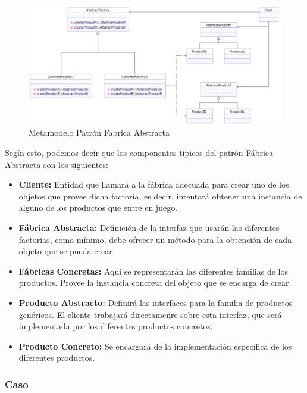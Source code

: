 \begin{figure}[th!]
	\centering
	\includegraphics[width=1.0\linewidth]{arquitectura/imagenes/modeloFabAbs}
	\caption{Metamodelo Patrón Fabrica Abstracta}
	\label{fig:metamodelo fabrica abstracta}
\end{figure}

Segín esto, podemos decir que los componentes típicos del patrón Fábrica Abstracta son los siguientes:

\begin{itemize}
	\item \textbf{Cliente: }Entidad que llamará a la fábrica adecuada para crear uno de los objetos que provee dicha factoría, es decir, intentará obtener una instancia de alguno de los productos que entre en juego.
	\item \textbf{Fábrica Abstracta: }Definición de la interfaz que usarán las diferentes factorías, como mínimo, debe ofrecer un método para la obtención de cada objeto que se pueda crear
	\item \textbf{Fábricas Concretas: } Aquí se representarán las diferentes familias de los productos. Provee la instancia concreta del objeto que se encarga de crear.
	\item \textbf{Producto Abstracto: }Definirá las interfaces para la familia de productos genéricos. El cliente trabajará directamenre sobre esta interfaz, que será implementada por los diferentes productos concretos.
	\item \textbf{Producto Concreto: } Se encargará de la implementación específica de los diferentes productos.
\end{itemize}



\subsubsection{Caso}

